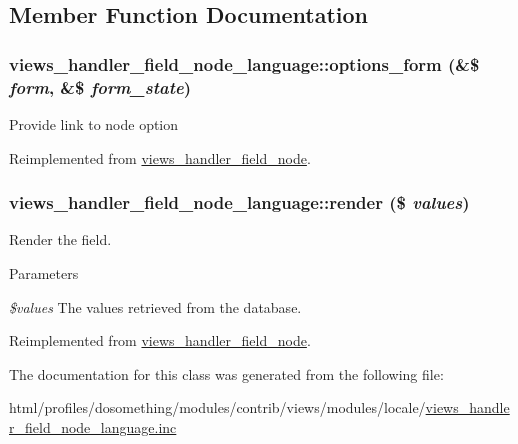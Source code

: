 \subsection{Member Function Documentation}
\hypertarget{classviews__handler__field__node__language_a5b37f58031ab251591bc4aad0651e8b4}{
\subsubsection[{options\_\-form}]{\setlength{\rightskip}{0pt plus 5cm}views\_\-handler\_\-field\_\-node\_\-language::options\_\-form (\&\$ {\em form}, \/  \&\$ {\em form\_\-state})}}
\label{classviews__handler__field__node__language_a5b37f58031ab251591bc4aad0651e8b4}
Provide link to node option 

Reimplemented from \hyperlink{classviews__handler__field__node_af3d8a04be282a20079ea4fb82e768910}{views\_\-handler\_\-field\_\-node}.\hypertarget{classviews__handler__field__node__language_a04be837ecac8fcbbb38fb1a17e45263a}{
\subsubsection[{render}]{\setlength{\rightskip}{0pt plus 5cm}views\_\-handler\_\-field\_\-node\_\-language::render (\$ {\em values})}}
\label{classviews__handler__field__node__language_a04be837ecac8fcbbb38fb1a17e45263a}
Render the field.


\begin{DoxyParams}{Parameters}
\item[{\em \$values}]The values retrieved from the database. \end{DoxyParams}


Reimplemented from \hyperlink{classviews__handler__field__node_afe7681e1188ad74ce9b604ad3ba864c0}{views\_\-handler\_\-field\_\-node}.

The documentation for this class was generated from the following file:\begin{DoxyCompactItemize}
\item 
html/profiles/dosomething/modules/contrib/views/modules/locale/\hyperlink{views__handler__field__node__language_8inc}{views\_\-handler\_\-field\_\-node\_\-language.inc}\end{DoxyCompactItemize}
